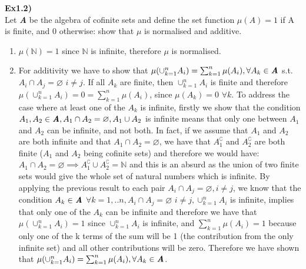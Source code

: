 \documentclass[12pt,mythesisstyle]{report}
\begin{document}
\textbf{Ex1.2)}\\
Let \textbf{\textit{A}} be the algebra of cofinite sets and define the set function \(\mu(A)=1\) if A is finite, and 0 otherwise: show that \(\mu\) is normalised and additive.
\begin{enumerate}
\item \(\mu(\mathbb{N})=1\) since \(\mathbb{N}\) is infinite, therefore \(\mu\) is normalised.\\
\item For additivity we have to show that \(\mu(\cup_{k=1}^nA_i)=\sum_{k=1}^n\mu(A_i), \forall A_k\in\textbf{\textit{A}}\) s.t. \(A_i\cap A_j=\varnothing\) \(i\neq j\). If all \(A_k\) are finite, then \(\cup_{k=1}^nA_i\) is finite and therefore \(\mu(\cup_{k=1}^nA_i)=0=\sum_{k=1}^n\mu(A_i)\), since \(\mu(A_k)=0\) \(\forall k\). To address the case where at least one of the \(A_k\) is infinite, firstly we show that the condition \(A_1, A_2\in\textbf{\textit{A}}, A_1\cap A_2=\varnothing, A_1\cup A_2\) is infinite means that only one between \(A_1\) and \(A_2\) can be infinite, and not both. In fact, if we assume that \(A_1\) and \(A_2\) are both infinite and that \(A_1\cap A_2=\varnothing\), we have that \(A_1^\complement\) and \(A_2^\complement\) are both finite (\(A_1\) and \(A_2\) being cofinite sets) and therefore we would have: \(A_1\cap A_2=\varnothing\implies A_1^\complement\cup A_2^\complement=\mathbb{N}\) and this is an absurd as the union of two finite sets would give the whole set of natural numbers which is infinite. By applying the previous result to each pair \(A_i\cap A_j=\varnothing,  i\neq j\), we know that the condition \(A_k\in\textbf{\textit{A}}\) \(\forall k=1,..n,A_i\cap A_j=\varnothing\) \(i\neq j,\cup_{k=1}^nA_i\) is infinite, implies that only one of the \(A_k\) can be infinite and therefore we have that \(\mu(\cup_{k=1}^nA_i)=1\) since \(\cup_{k=1}^nA_i\) is infinite, and \(\sum_{k=1}^n\mu(A_i)=1\) because only one of the k terms of the sum will be 1 (the contribution from the only infinite set) and all other contributions will be zero. Therefore we have shown that \(\mu(\cup_{k=1}^nA_i)=\sum_{k=1}^n\mu(A_i), \forall A_k\in\textbf{\textit{A}}\).\\
\end{enumerate}
\end{document}
